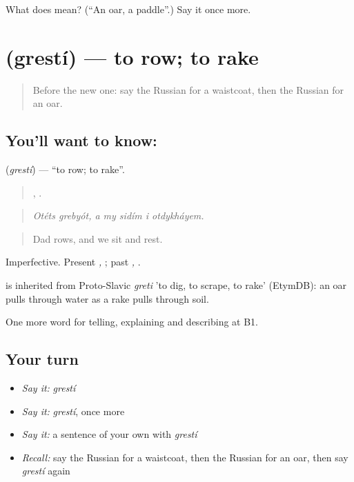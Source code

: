 \begin{tcolorbox}[breakable,colback=teal!4,colframe=teal!35!black,title={Before you move on}]
What does  mean? (\textquotedblleft{}An oar, a paddle\textquotedblright{}.) Say it once more.
\end{tcolorbox}
\section[\texorpdfstring{\ru{грести} (grestí)}{грести (grestí)}]{ (grestí) — to row; to rake}

\label{lesson:RU-C426-gresti}



\begin{quote}
Before the new one: say the Russian for a waistcoat, then the Russian for an oar.
\end{quote}

\subsection*{You'll want to know: }
\textbf{} (\emph{grestí}) — \textquotedblleft{}to row; to rake\textquotedblright{}.

\begin{quote}
 ,     .
\end{quote}

\begin{quote}
\emph{Otéts grebyót, a my sidím i otdykháyem.}
\end{quote}

\begin{quote}
Dad rows, and we sit and rest.
\end{quote}

Imperfective. Present \emph{, }; past \emph{, }.

\begin{cousinweb}
\emph{} is inherited from Proto-Slavic \emph{greti} 'to dig, to scrape, to rake' (EtymDB): an oar pulls through water as a rake pulls through soil.
\end{cousinweb}

\begin{grammarlens}[title={What you've built}]
One more word for telling, explaining and describing at B1.
\end{grammarlens}

\subsection*{Your turn}
\begin{itemize}
\raggedright
  \item \emph{Say it:} \emph{grestí}
  \item \emph{Say it:} \emph{grestí}, once more
  \item \emph{Say it:} a sentence of your own with \emph{grestí}
  \item \emph{Recall:} say the Russian for a waistcoat, then the Russian for an oar, then say \emph{grestí} again
\end{itemize}


